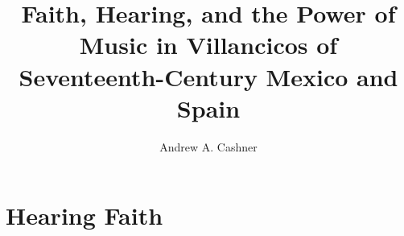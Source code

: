 \documentclass{vcbook}
\begin{document}
\begin{titlingpage}
\title{Faith, Hearing, and the Power of Music in Villancicos of Seventeenth-Century Mexico and Spain}
\author{Andrew A. Cashner}
\maketitle
\end{titlingpage}

\tableofcontents*
\listoffigures
\listoftables
\listofpoems
\listofexamples

\part{Hearing Faith}

% 

% 
% 
% 

% 
% 

\printbibliography
\end{document}
